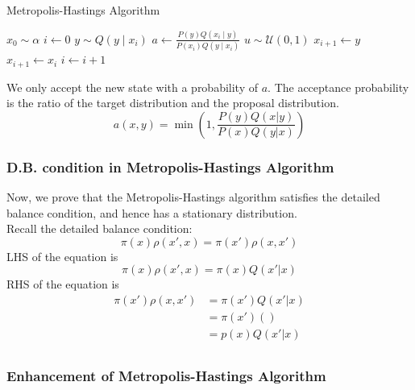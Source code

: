 \documentclass[12pt,a4paper]{article}
\begin{document}
\begin{algorithm}
\caption{Metropolis-Hastings Algorithm}\label{metropolis_hastings}
\begin{algorithmic}[1]
\State $x_0 \sim \alpha$ 
\State $i \leftarrow 0$ 
 
    \State $y \sim Q(y \mid x_i)$ 
    \State $a \leftarrow \frac{P(y)Q(x_i \mid y)}{P(x_i)Q(y \mid x_i)}$ 
    \State $u \sim \mathcal{U}(0,1)$ 
        \State $x_{i+1} \leftarrow y$ 
    \Else
        \State $x_{i+1} \leftarrow x_i$ 
    \EndIf
    \State $i \leftarrow i+1$
\EndWhile
\end{algorithmic}
\end{algorithm}
We only accept the new state with a probability of $a$. The acceptance probability is the ratio of the target distribution and the proposal distribution.\\
$$
a(x,y) = \min\left(1, \frac{P(y)Q(x|y)}{P(x)Q(y|x)}\right)
$$
\subsubsection{D.B. condition in Metropolis-Hastings Algorithm}
Now, we prove that the Metropolis-Hastings algorithm satisfies the detailed balance condition, and hence has a stationary distribution.\\
Recall the detailed balance condition:
$$
\pi(x)\rho(x',x) = \pi(x')\rho(x,x')
$$
LHS of the equation is
$$
\pi(x)\rho(x',x) = \pi(x)Q(x'|x)
$$
RHS of the equation is
\begin{align*}
    \pi(x')\rho(x,x') &= \pi(x')Q(x'|x)\\
    & = \pi(x')()\\
    & = p(x)Q(x'|x)\\
\end{align*}
\subsubsection{Enhancement of Metropolis-Hastings Algorithm}
\end{document}
